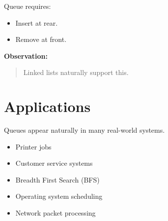 \documentclass[11pt,a4paper]{book}
\begin{document}
Queue requires:

\begin{itemize}[leftmargin=2em]
    \item Insert at rear.
    \item Remove at front.
\end{itemize}

\medskip

\textbf{Observation:}

\begin{quote}
Linked lists naturally support this.
\end{quote}
\section{Applications}

Queues appear naturally in many real-world systems.

\begin{itemize}[leftmargin=2em]
    \item Printer jobs
    \item Customer service systems
    \item Breadth First Search (BFS)
    \item Operating system scheduling
    \item Network packet processing
\end{itemize}













\end{document}
